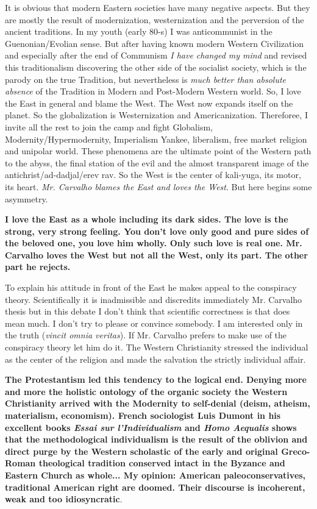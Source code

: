 \begin{quotationx}
It is obvious that modern Eastern societies have many negative aspects. But they are mostly the result of modernization, westernization and the perversion of the ancient traditions. In my youth (early 80-s) I was anticommunist in the Guenonian/Evolian sense. But after having known modern Western Civilization and especially after the end of Communism \emph{I have changed my mind} and revised this traditionalism discovering the other side of the socialist society, which is the parody on the true Tradition, but nevertheless is \emph{much better than absolute absence} of the Tradition in Modern and Post-Modern Western world. So, I love the East in general and blame the West. The West now expands itself on the planet. So the globalization is Westernization and Americanization. Thereforee, I invite all the rest to join the camp and fight Globalism, Modernity/Hypermodernity, Imperialism Yankee, liberalism, free market religion and unipolar world. These phenomena are the ultimate point of the Western path to the abyss, the final station of the evil and the almost transparent image of the antichrist/ad-dadjal/erev rav. So the West is the center of kali-yuga, its motor, its heart. \emph{Mr. Carvalho blames the East and loves the West}. But here begins some asymmetry.

\textbf{I love the East as a whole including its dark sides. The love is the strong, very strong feeling. You don't love only good and pure sides of the beloved one, you love him wholly. Only such love is real one. Mr. Carvalho loves the West but not all the West, only its part. The other part he rejects.}

To explain his attitude in front of the East he makes appeal to the conspiracy theory. Scientifically it is inadmissible and discredits immediately Mr. Carvalho thesis but in this debate I don't think that scientific correctness is that does mean much. I don't try to please or convince somebody. I am interested only in the truth (\emph{vincit omnia veritas}). If Mr. Carvalho prefers to make use of the conspiracy theory let him do it. The Western Christianity stressed the individual as the center of the religion and made the salvation the strictly individual affair.

\textbf{The Protestantism led this tendency to the logical end. Denying more and more the holistic ontology of the organic society the Western Christianity arrived with the Modernity to self-denial (deism, atheism, materialism, economism). French sociologist Luis Dumont in his excellent books \emph{Essai sur l'Individualism} and \emph{Homo Aequalis} shows that the methodological individualism is the result of the oblivion and direct purge by the Western scholastic of the early and original Greco-Roman theological tradition conserved intact in the Byzance and Eastern Church as whole... My opinion: American paleoconservatives, traditional American right are doomed. Their discourse is incoherent, weak and too idiosyncratic}.
\end{quotationx}


